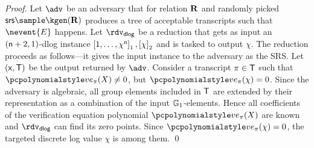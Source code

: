 \documentclass[runningheads,11pt]{llncs}
\begin{document}
\begin{proof}
   Let $\adv$ be an adversary that for relation
  $\mathbf{R}$ and randomly picked $\srs \sample \kgen(\REL)$ produces a tree of
  acceptable transcripts such that $\nevent{E}$ happens. Let $\rdvdlog$ be a
  reduction that gets as input an $(\mathsf{n} + 2, 1)$-dlog instance
  $\left[1, \ldots, \chi^{\mathsf{n}}\right]_{1}, \left[\chi\right]_{2}$ and is tasked to output
  $\chi$. The reduction proceeds as follows---it gives the input instance to the
  adversary as the SRS. Let $(\mathsf{x}, \mathsf{T})$ be the output returned by $\adv$.
  Consider a transcript $\pi \in \mathsf{T}$ such that
  $\vereq_\zkproof(X) \neq 0$, but $\vereq_\zkproof(\chi) = 0$. Since the
  adversary is algebraic, all group elements included in $\mathsf{T}$ are extended by
  their representation as a combination of the input $\mathbb{G}_1$-elements. Hence all coefficients of
  the verification equation polynomial $\vereq_\zkproof(X)$ are known and $\rdvdlog$ can
  find its zero points. Since $\vereq_\zkproof(\chi) = 0$, the targeted discrete log
  value $\chi$ is among them. \qed
\end{proof}
\end{document}
